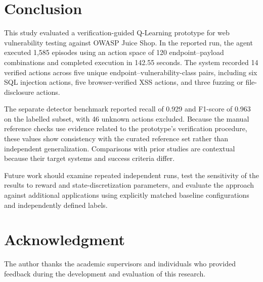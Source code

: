 \documentclass[conference]{IEEEtran}
\begin{document}
\section{Conclusion}

This study evaluated a verification-guided Q-Learning
prototype for web vulnerability testing against OWASP
Juice Shop. In the reported run, the agent executed
1,585 episodes using an action space of 120
endpoint--payload combinations and completed execution
in 142.55 seconds. The system recorded 14 verified
actions across five unique endpoint--vulnerability-class pairs,
including six SQL injection actions, five browser-verified
XSS actions, and three fuzzing or file-disclosure actions.

The separate detector benchmark reported recall of 0.929
and F1-score of 0.963 on the labelled subset, with 46 unknown
actions excluded. Because the manual reference checks use
evidence related to the prototype's verification procedure,
these values show consistency with the curated reference set
rather than independent generalization. Comparisons with
prior studies are contextual because their target systems and
success criteria differ.

Future work should examine repeated independent runs,
test the sensitivity of the results to reward and
state-discretization parameters, and evaluate the approach
against additional applications using explicitly matched
baseline configurations and independently defined labels.

\section*{Acknowledgment}

The author thanks the academic supervisors and individuals
who provided feedback during the development and evaluation
of this research.
\end{document}

